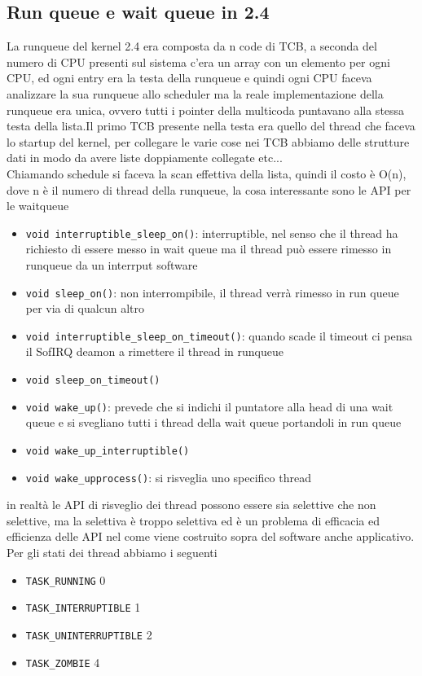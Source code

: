 \documentclass[12pt, oneside]{extbook}
\begin{document}
\subsection{Run queue e wait queue in 2.4}
La runqueue del kernel 2.4 era composta da n code di TCB, a seconda del numero di CPU presenti sul sistema c'era un array con un elemento per ogni CPU, ed ogni entry era la testa della runqueue e quindi ogni CPU faceva analizzare la sua runqueue allo scheduler ma la reale implementazione della runqueue era unica, ovvero tutti i pointer della multicoda puntavano alla stessa testa della lista.Il primo TCB presente nella testa era quello del thread che faceva lo startup del kernel, per collegare le varie cose nei TCB abbiamo delle strutture dati in modo da avere liste doppiamente collegate etc...\\Chiamando schedule si faceva la scan effettiva della lista, quindi il costo è O(n), dove n è il numero di thread della runqueue, la cosa interessante sono le API per le waitqueue
\begin{itemize}
\item \texttt{void interruptible\_sleep\_on()}: interruptible, nel senso che il thread ha richiesto di essere messo in wait queue ma il thread può essere rimesso in runqueue da un interrput software
\item \texttt{void sleep\_on()}: non interrompibile, il thread verrà rimesso in run queue per via di qualcun altro
\item \texttt{void interruptible\_sleep\_on\_timeout()}: quando scade il timeout ci pensa il SofIRQ deamon a rimettere il thread in runqueue
\item \texttt{void sleep\_on\_timeout()}
\item \texttt{void wake\_up()}: prevede che si indichi il puntatore alla head di una wait queue e si svegliano tutti i thread della wait queue portandoli in run queue
\item \texttt{void wake\_up\_interruptible()}
\item \texttt{void wake\_up\:process()}: si risveglia uno specifico thread
\end{itemize}
in realtà le API di risveglio dei thread possono essere sia selettive che non selettive, ma la selettiva è troppo selettiva ed è un problema di efficacia ed efficienza delle API nel come viene costruito sopra del software anche applicativo.\\Per gli stati dei thread abbiamo i seguenti
\begin{itemize}
\item \texttt{TASK\_RUNNING} 0
\item \texttt{TASK\_INTERRUPTIBLE}	1
\item \texttt{TASK\_UNINTERRUPTIBLE}	2
\item \texttt{TASK\_ZOMBIE} 4
\end{itemize}
\end{document}
